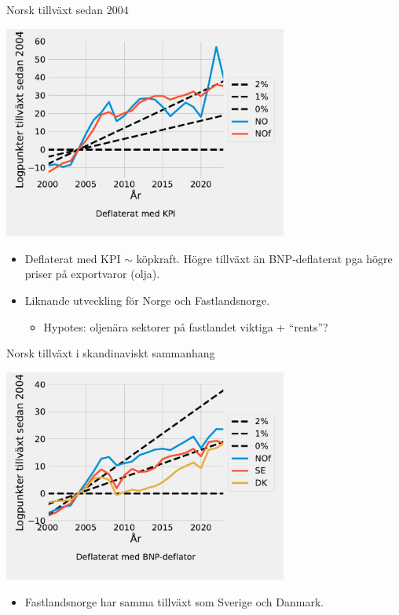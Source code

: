 \documentclass{beamer}
\begin{document}
\begin{frame}{Norsk tillväxt sedan 2004}
    \begin{center}
        \includegraphics[width=0.7\textwidth]{figures/GDP_growth1_NO.pdf}
        \begin{itemize}
            \small
            \item Deflaterat med KPI $\sim$ köpkraft. Högre tillväxt än BNP-deflaterat pga högre priser på exportvaror  (olja).
            \item Liknande utveckling för Norge och Fastlandsnorge. 
            \begin{itemize}
                \item Hypotes: oljenära sektorer på fastlandet viktiga + ``rents''?
            \end{itemize}
        \end{itemize}
    \end{center}
\end{frame}

\begin{frame}{Norsk tillväxt i skandinaviskt sammanhang}

    \label{scandinavia_gdp}
    \begin{center}
        \includegraphics[width=0.7\textwidth]{figures/GDP_growth0_Scandinavia.pdf}
        \begin{itemize}
            \item Fastlandsnorge har samma tillväxt som Sverige och Danmark.
        \end{itemize}
    \end{center}

    \hyperlink{scandinavia_cpi}{}
\end{frame}
\end{document}
